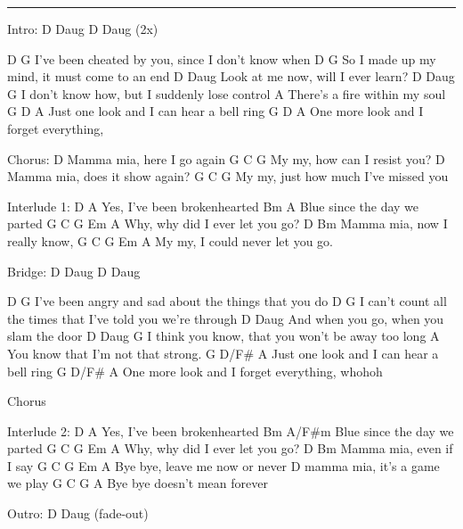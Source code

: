 \noindent\rule{\columnwidth}{1pt}

\begin{multicols}{2}
\begin{lstsong}
Intro: D Daug D Daug (2x)

D                                          G
I've been cheated by you, since I don't know when
D                                        G
So I made up my mind, it must come to an end
D               Daug
Look at me now,   will I ever learn?
D               Daug              G
I don't know how, but I suddenly lose control
                   A
There's a fire within my soul
G    D   A
Just one look and I can hear a bell ring
G   D    A
One more look and I forget everything,

Chorus:
D                          
Mamma mia, here I go again
G C   G
  My  my, how can I resist you?
D
Mamma mia, does it show again?
G C   G
  My  my, just how much I've missed you

Interlude 1:
D              A
Yes, I've been brokenhearted
Bm             A
Blue since the day we parted
G C    G   Em         A
  Why, why did I ever let you go?
D          Bm 
Mamma mia, now I really know,
G C  G   Em            A  
  My my, I could never let you go.

Bridge: D Daug D Daug

D                                           G
I've been angry and sad about the things that you do
D                                           G
I can't count all the times that I've told you we're through
D               Daug
And when you go,  when you slam the door
D               Daug                  G
I think you know, that you won't be away too long
                  A
You know that I'm not that strong.
G    D/F#  A
Just one   look and I can hear a bell ring
G   D/F# A
One more look and I forget everything, whohoh

Chorus 

Interlude 2:
D              A
Yes, I've been brokenhearted
Bm             A/F#m
Blue since the day we parted
G C    G   Em         A
  Why, why did I ever let you go?
D          Bm
Mamma mia, even if I say
G C   G    Em              A
  Bye bye, leave me now or never
D
mamma mia, it's a game we play
G C   G                   A
  Bye bye doesn't mean forever

Outro: D Daug (fade-out)
\end{lstsong}
\end{multicols}
\newpage

